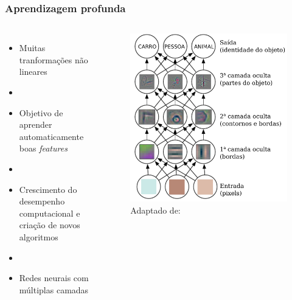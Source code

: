 \documentclass[10pt]{beamer}
\begin{document}
\begin{frame}[fragile]
  \frametitle{Aprendizagem profunda}

  \begin{columns}[onlytextwidth]
      
      \begin{itemize}
        \item Muitas tranformações não lineares
        \item[\ ] \ 
        \item Objetivo de aprender automaticamente boas \textit{features}
        \item[\ ] \ 
        \item Crescimento do desempenho computacional e criação de novos algoritmos
        \item[\ ] \ 
        \item Redes neurais com múltiplas camadas
      \end{itemize}

    \column{0.55\textwidth}
      
      \begin{figure}
      \begin{center}
        \includegraphics[scale=0.2]{img/aprendendodeep2.pdf}
      \end{center}
      \caption{Adaptado de: }
    \end{figure}
       

  \end{columns}
  

\end{frame}
\end{document}
